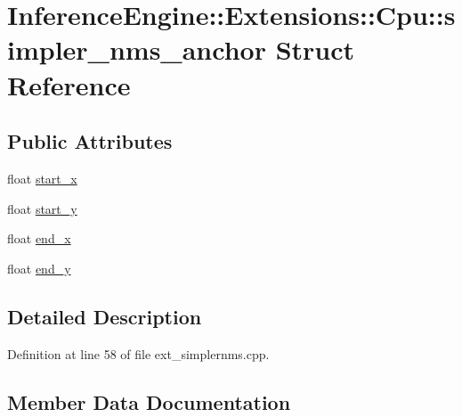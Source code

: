 \hypertarget{structInferenceEngine_1_1Extensions_1_1Cpu_1_1simpler__nms__anchor}{}\section{Inference\+Engine\+:\+:Extensions\+:\+:Cpu\+:\+:simpler\+\_\+nms\+\_\+anchor Struct Reference}
\label{structInferenceEngine_1_1Extensions_1_1Cpu_1_1simpler__nms__anchor}
\subsection*{Public Attributes}
\begin{DoxyCompactItemize}
\item 
float \hyperlink{structInferenceEngine_1_1Extensions_1_1Cpu_1_1simpler__nms__anchor_a115e61c41a6ad4d41470119edeca3829}{start\+\_\+x}
\item 
float \hyperlink{structInferenceEngine_1_1Extensions_1_1Cpu_1_1simpler__nms__anchor_a8b8013577b401a0a51a629f95d9aaa6b}{start\+\_\+y}
\item 
float \hyperlink{structInferenceEngine_1_1Extensions_1_1Cpu_1_1simpler__nms__anchor_af07a5993a79b25f3e3156aae639942d0}{end\+\_\+x}
\item 
float \hyperlink{structInferenceEngine_1_1Extensions_1_1Cpu_1_1simpler__nms__anchor_a42e7a3fd477d78aee09a64a973954d48}{end\+\_\+y}
\end{DoxyCompactItemize}


\subsection{Detailed Description}


Definition at line 58 of file ext\+\_\+simplernms.\+cpp.



\subsection{Member Data Documentation}
